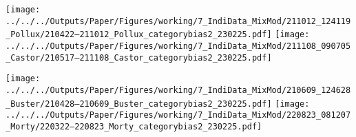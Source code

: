\begin{minipage}{\textwidth}

\texttt{[image: ../../../Outputs/Paper/Figures/working/7\_IndiData\_MixMod/211012\_124119\_Pollux/210422--211012\_Pollux\_categorybias2\_230225.pdf]}
\label{fig:BiasCurvesPollux}
\hfill
\texttt{[image: ../../../Outputs/Paper/Figures/working/7\_IndiData\_MixMod/211108\_090705\_Castor/210517--211108\_Castor\_categorybias2\_230225.pdf]}
\label{fig:BiasCurvesCastor}

\texttt{[image: ../../../Outputs/Paper/Figures/working/7\_IndiData\_MixMod/210609\_124628\_Buster/210428--210609\_Buster\_categorybias2\_230225.pdf]}
\label{fig:BiasCurvesBuster}
\hfill
\texttt{[image: ../../../Outputs/Paper/Figures/working/7\_IndiData\_MixMod/220823\_081207\_Morty/220322--220823\_Morty\_categorybias2\_230225.pdf]}
\label{fig:BiasCurvesMorty}

\label{fig:BiasCurvesIndividual}
\end{minipage}


\begin{minipage}{\textwidth}


\label{fig:SimilarityMatrixPollux}
\hfill
    
\label{fig:SimilarityMatrixCastor}

    
\label{fig:SimilarityMatrixBuster}
\hfill
    
\label{fig:SimilarityMatrixMorty}

\label{fig:SimilarityMatrixIndividual}
\end{minipage}

